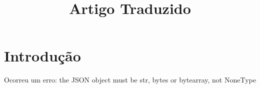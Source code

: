\documentclass{article}
\title{Artigo Traduzido}
\begin{document}
\maketitle
\section{Introdução}
Ocorreu um erro: the JSON object must be str, bytes or bytearray, not NoneType
\end{document}
